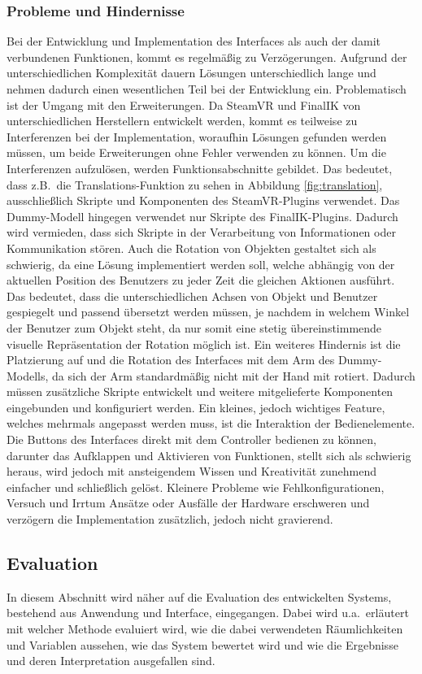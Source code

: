 \subsubsection{Probleme und Hindernisse}
Bei der Entwicklung und Implementation des Interfaces als auch der damit verbundenen Funktionen, kommt es regelmäßig zu Verzögerungen.  Aufgrund der unterschiedlichen Komplexität dauern Lösungen unterschiedlich lange und nehmen dadurch einen wesentlichen Teil bei der Entwicklung ein. Problematisch ist der Umgang mit den Erweiterungen. Da SteamVR und FinalIK von unterschiedlichen Herstellern entwickelt werden, kommt es teilweise zu Interferenzen bei der Implementation, woraufhin Lösungen gefunden werden müssen, um beide Erweiterungen ohne Fehler verwenden zu können. Um die Interferenzen aufzulösen, werden Funktionsabschnitte gebildet. Das bedeutet, dass z.B.~die Translations-Funktion zu sehen in Abbildung \ref{fig:translation}, ausschließlich Skripte und Komponenten des SteamVR-Plugins verwendet. Das Dummy-Modell hingegen verwendet nur Skripte des FinalIK-Plugins. Dadurch wird vermieden, dass sich Skripte in der Verarbeitung von Informationen oder Kommunikation stören. Auch die Rotation von Objekten gestaltet sich als schwierig, da eine Lösung implementiert werden soll, welche abhängig von der aktuellen Position des Benutzers zu jeder Zeit die gleichen Aktionen ausführt. Das bedeutet, dass die unterschiedlichen Achsen von Objekt und Benutzer gespiegelt und passend übersetzt werden müssen, je nachdem in welchem Winkel der Benutzer zum Objekt steht, da nur somit eine stetig übereinstimmende visuelle Repräsentation der Rotation möglich ist. Ein weiteres Hindernis ist die Platzierung auf und die Rotation des Interfaces mit dem Arm des Dummy-Modells, da sich der Arm standardmäßig nicht mit der Hand mit rotiert. Dadurch müssen zusätzliche Skripte entwickelt und weitere mitgelieferte Komponenten eingebunden und konfiguriert werden. Ein kleines, jedoch wichtiges Feature, welches mehrmals angepasst werden muss, ist die Interaktion der Bedienelemente. Die Buttons des Interfaces direkt mit dem Controller bedienen zu können, darunter das Aufklappen und Aktivieren von Funktionen, stellt sich als schwierig heraus, wird jedoch mit ansteigendem Wissen und Kreativität zunehmend einfacher und schließlich gelöst. Kleinere Probleme wie Fehlkonfigurationen, Versuch und Irrtum Ansätze oder Ausfälle der Hardware erschweren und verzögern die Implementation zusätzlich, jedoch nicht gravierend.

\subsection{Evaluation}
In diesem Abschnitt wird näher auf die Evaluation des entwickelten Systems, bestehend aus Anwendung und Interface, eingegangen. Dabei wird u.a.~erläutert mit welcher Methode evaluiert wird, wie die dabei verwendeten Räumlichkeiten und Variablen aussehen, wie das System bewertet wird und wie die Ergebnisse und deren Interpretation ausgefallen sind.

